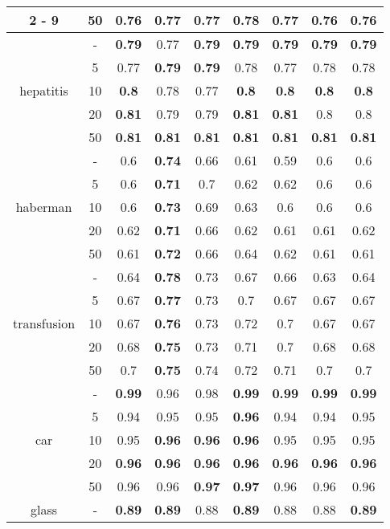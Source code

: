 \documentclass{article}%
\begin{document}
\begin{longtable}{c|c|ccccccc}
\cline{2%
-%
9}%
&50&0.76&0.77&0.77&\textbf{0.78}&0.77&0.76&0.76\\%
\hline%
\multirow{5}{*}{hepatitis}&{-}&\textbf{0.79}&0.77&\textbf{0.79}&\textbf{0.79}&\textbf{0.79}&\textbf{0.79}&\textbf{0.79}\\%
\cline{2%
-%
9}%
&5&0.77&\textbf{0.79}&\textbf{0.79}&0.78&0.77&0.78&0.78\\%
\cline{2%
-%
9}%
&10&\textbf{0.8}&0.78&0.77&\textbf{0.8}&\textbf{0.8}&\textbf{0.8}&\textbf{0.8}\\%
\cline{2%
-%
9}%
&20&\textbf{0.81}&0.79&0.79&\textbf{0.81}&\textbf{0.81}&0.8&0.8\\%
\cline{2%
-%
9}%
&50&\textbf{0.81}&\textbf{0.81}&\textbf{0.81}&\textbf{0.81}&\textbf{0.81}&\textbf{0.81}&\textbf{0.81}\\%
\hline%
\multirow{5}{*}{haberman}&{-}&0.6&\textbf{0.74}&0.66&0.61&0.59&0.6&0.6\\%
\cline{2%
-%
9}%
&5&0.6&\textbf{0.71}&0.7&0.62&0.62&0.6&0.6\\%
\cline{2%
-%
9}%
&10&0.6&\textbf{0.73}&0.69&0.63&0.6&0.6&0.6\\%
\cline{2%
-%
9}%
&20&0.62&\textbf{0.71}&0.66&0.62&0.61&0.61&0.62\\%
\cline{2%
-%
9}%
&50&0.61&\textbf{0.72}&0.66&0.64&0.62&0.61&0.61\\%
\hline%
\multirow{5}{*}{transfusion}&{-}&0.64&\textbf{0.78}&0.73&0.67&0.66&0.63&0.64\\%
\cline{2%
-%
9}%
&5&0.67&\textbf{0.77}&0.73&0.7&0.67&0.67&0.67\\%
\cline{2%
-%
9}%
&10&0.67&\textbf{0.76}&0.73&0.72&0.7&0.67&0.67\\%
\cline{2%
-%
9}%
&20&0.68&\textbf{0.75}&0.73&0.71&0.7&0.68&0.68\\%
\cline{2%
-%
9}%
&50&0.7&\textbf{0.75}&0.74&0.72&0.71&0.7&0.7\\%
\hline%
\multirow{5}{*}{car}&{-}&\textbf{0.99}&0.96&0.98&\textbf{0.99}&\textbf{0.99}&\textbf{0.99}&\textbf{0.99}\\%
\cline{2%
-%
9}%
&5&0.94&0.95&0.95&\textbf{0.96}&0.94&0.94&0.95\\%
\cline{2%
-%
9}%
&10&0.95&\textbf{0.96}&\textbf{0.96}&\textbf{0.96}&0.95&0.95&0.95\\%
\cline{2%
-%
9}%
&20&\textbf{0.96}&\textbf{0.96}&\textbf{0.96}&\textbf{0.96}&\textbf{0.96}&\textbf{0.96}&\textbf{0.96}\\%
\cline{2%
-%
9}%
&50&0.96&0.96&\textbf{0.97}&\textbf{0.97}&0.96&0.96&0.96\\%
\hline%
\multirow{5}{*}{glass}&{-}&\textbf{0.89}&\textbf{0.89}&0.88&\textbf{0.89}&0.88&0.88&\textbf{0.89}\\%

\end{longtable}
\end{document}
